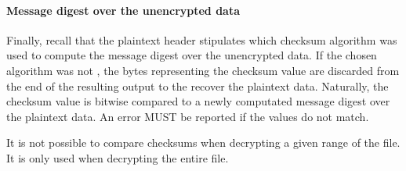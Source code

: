 \paragraph{Message digest over the unencrypted data}%
Finally, recall that the plaintext header stipulates which checksum algorithm was used to compute the message digest over the unencrypted data. If the chosen algorithm was not , the bytes representing the checksum value are discarded from the end of the resulting output to the recover the plaintext data.
% 
Naturally, the checksum value is bitwise compared to a newly computated message digest over the plaintext data. An error MUST be reported if the values do not match.

It is not possible to compare checksums when decrypting a given range of the file. It is only used when decrypting the entire file.
